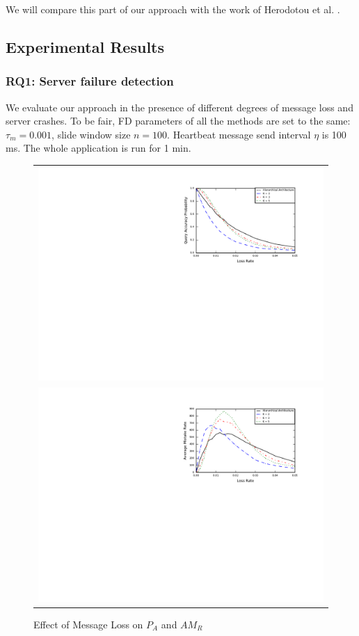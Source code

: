 \documentclass{sig-alternate-05-2015}
\begin{document}
We will compare this part of our approach with the work of Herodotou et al. \cite{herodotou2014scalable}.

\subsection{Experimental Results}

\subsubsection*{RQ1: Server failure detection}
\quad We evaluate our approach in the presence of different degrees of message loss and server crashes. To be fair, FD parameters of all the methods are set to the same: $\tau_m=0.001$, slide window size $n=100$. Heartbeat message send interval $\eta$ is 100 ms. The whole application is run for 1 min.

\begin{figure}[t]
  \centering
  \begin{tabular}{c}
  \includegraphics[scale=0.7]{r1} \\
  \includegraphics[scale=0.7]{r2}
  \end{tabular}
  \caption{Effect of Message Loss on $P_A$ and $AM_R$}
\end{figure}
\end{document}
